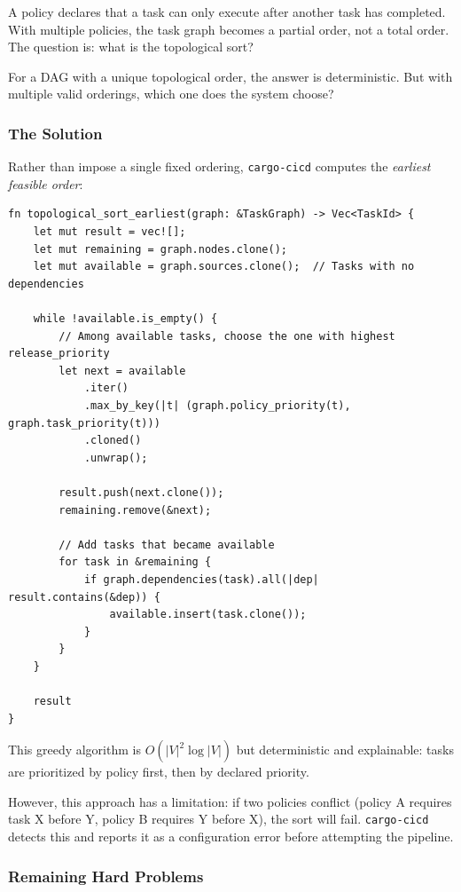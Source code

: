 A policy declares that a task can only execute after another task has completed. With multiple policies, the task graph becomes a partial order, not a total order. The question is: what is the topological sort?

For a DAG with a unique topological order, the answer is deterministic. But with multiple valid orderings, which one does the system choose?

\subsubsection{The Solution}

Rather than impose a single fixed ordering, \texttt{cargo-cicd} computes the \emph{earliest feasible order}:

\begin{lstlisting}[caption={Greedy topological sort with priority}]
fn topological_sort_earliest(graph: &TaskGraph) -> Vec<TaskId> {
    let mut result = vec![];
    let mut remaining = graph.nodes.clone();
    let mut available = graph.sources.clone();  // Tasks with no dependencies

    while !available.is_empty() {
        // Among available tasks, choose the one with highest release_priority
        let next = available
            .iter()
            .max_by_key(|t| (graph.policy_priority(t), graph.task_priority(t)))
            .cloned()
            .unwrap();

        result.push(next.clone());
        remaining.remove(&next);

        // Add tasks that became available
        for task in &remaining {
            if graph.dependencies(task).all(|dep| result.contains(&dep)) {
                available.insert(task.clone());
            }
        }
    }

    result
}
\end{lstlisting}

This greedy algorithm is $O(|V|^2 \log |V|)$ but deterministic and explainable: tasks are prioritized by policy first, then by declared priority.

However, this approach has a limitation: if two policies conflict (policy A requires task X before Y, policy B requires Y before X), the sort will fail. \texttt{cargo-cicd} detects this and reports it as a configuration error before attempting the pipeline.

\subsubsection{Remaining Hard Problems}

